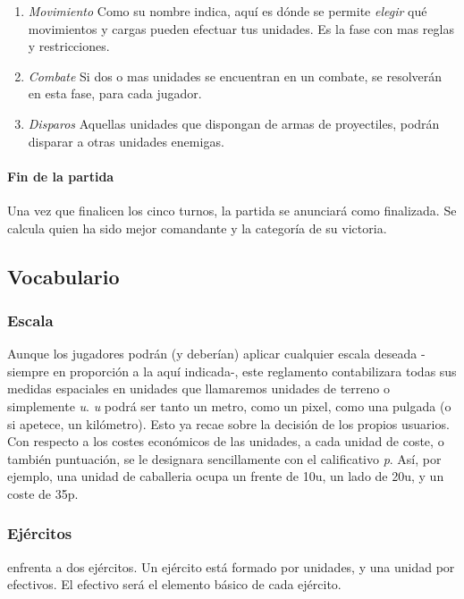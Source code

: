 \begin{enumerate}
\item \textit{Movimiento}
Como su nombre indica, aquí es dónde se permite \emph{elegir} qué movimientos y cargas pueden efectuar tus unidades. Es la fase con mas reglas y restricciones.

\item \textit{Combate}
Si dos o mas unidades se encuentran en un combate, se resolverán en
esta fase, para cada jugador.

\item \textit{Disparos}
Aquellas unidades que dispongan de armas de proyectiles, podrán
disparar a otras unidades enemigas.

\end{enumerate}

\paragraph{Fin de la partida}
Una vez que finalicen los cinco turnos, la partida se anunciará como
finalizada. Se calcula quien ha sido mejor comandante y la categoría de su victoria.

\subsection*{Vocabulario}
\label{vocabulario}
\subsubsection*{Escala}
Aunque los jugadores podrán (y deberían) aplicar cualquier escala
deseada -siempre en proporción a la aquí indicada-, este reglamento
contabilizara todas sus medidas espaciales en unidades que llamaremos
unidades de terreno o simplemente \textit{u}. \textit{u} podrá ser
tanto un metro, como un pixel, como una pulgada (o si apetece, un
kilómetro). Esto ya recae sobre la decisión de los propios
usuarios. Con respecto a los costes económicos de las unidades, a cada
unidad de coste, o también puntuación, se le designara sencillamente con el calificativo \textit{p}. Así, por ejemplo, una unidad de caballeria ocupa un frente de 10u, un lado de 20u, y un coste de 35p.

\subsubsection*{Ejércitos}
\gom enfrenta a dos ejércitos. Un ejército está formado por unidades,
y una unidad por efectivos. El efectivo será el elemento básico de
cada ejército.

